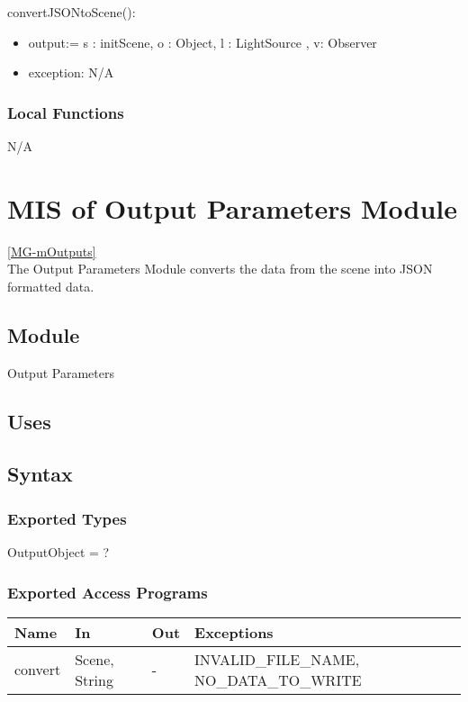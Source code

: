 \documentclass[12pt, titlepage]{article}
\begin{document}
\noindent convertJSONtoScene():
\begin{itemize}
	\item output:= s : initScene, o : Object, l : LightSource , v: Observer 
	\item exception: N/A
\end{itemize}

\subsubsection{Local Functions}
N/A

\newpage

\section{MIS of Output Parameters Module} \ref{MG-mOutputs} \\
The Output Parameters Module converts the data from the scene into JSON 
formatted data.

\subsection{Module}
Output Parameters

\subsection{Uses}

\subsection{Syntax}
\subsubsection{Exported Types}
OutputObject = ?

\subsubsection{Exported Access Programs}
\begin{center}
	\begin{tabular}{p{4cm} p{2cm} p{2cm} p{4cm}}
		\hline
		\textbf{Name} & \textbf{In} & \textbf{Out} & \textbf{Exceptions} \\
		\hline
		convert & Scene, String & - & INVALID\_FILE\_NAME, NO\_DATA\_TO\_WRITE\\
		\hline
	\end{tabular}
\end{center}
\end{document}
